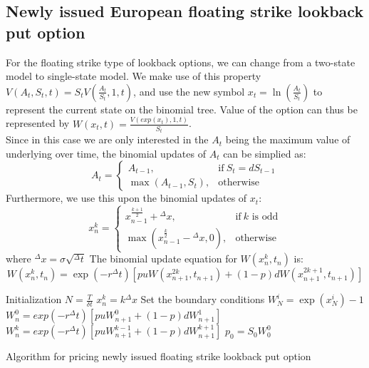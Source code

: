 \subsection{Newly issued European floating strike lookback put option}
For the floating strike type of lookback options, we can change from a two-state model to single-state model. We make use of this property $V(A_{t},S_{t},t) = S_{t}V(\frac{A_{t}}{S_{t}}, 1, t)$, and use the new symbol $x_{t} = \ln(\frac{A_{t}}{S_{t}})$ to represent the current state on the binomial tree. Value of the option can thus be represented by $W(x_{t}, t) = \frac{V(exp(x_{t}), 1, t)}{S_{t}}$.\\
Since in this case we are only interested in the $A_{t}$ being the maximum value of underlying over time, the binomial updates of $A_{t}$ can be simplied as:
\begin{equation}
  A_{t}=
  \begin{cases}
    A_{t-1}, & \text{if}\ S_{t} = dS_{t-1} \\
    \max(A_{t-1}, S_{t}), & \text{otherwise}
  \end{cases}
\end{equation}
Furthermore, we use this upon the binomial updates of $x_{t}$:
\begin{equation}
  x_{n}^{k}=
  \begin{cases}
    x_{n-1}^{\frac{k+1}{2}} + {^{\Delta}x}, & \text{if}\ k \text{ is odd} \\
    \max(x_{n-1}^{\frac{k}{2}} - {^{\Delta}x}, 0), & \text{otherwise}
  \end{cases}
\end{equation}
where ${^{\Delta}x} = \sigma \sqrt{^{\Delta}t}$
The binomial update equation for $W(x_{n}^{k}, t_{n})$ is:
$$ W(x_{n}^{k}, t_{n}) = \exp(-r{^{\Delta}t})[puW(x_{n+1}^{2k}, t_{n+1}) + (1-p)dW(x_{n+1}^{2k+1}, t_{n+1})] $$
\begin{algorithm}[H]
 Initialization\;
 $N = \frac{T}{\delta t}$\;
 $x_{n}^{k} = k{^{\Delta}x}$\;
 Set the boundary conditions\;
  {
  $W_{N}^{i} = \exp(x_{N}^{i}) - 1$\;
 }
  {
   {
    $W_{n}^{0} = exp(-r{^{\Delta}t})[puW_{n+1}^{0}+(1-p)dW_{n+1}^{1}]$\;
  }
   {
    $W_{n}^{k} = exp(-r{^{\Delta}t})[puW_{n+1}^{k-1}+(1-p)dW_{n+1}^{k+1}]$\;
  }
 }
 $p_{0} = S_{0}W_{0}^{0}$\;
\caption{Algorithm for pricing newly issued floating strike lookback put option}
\end{algorithm}
\newpage

